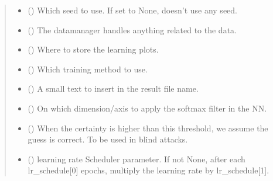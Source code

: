 \documentclass[letterpaper,10pt,english]{sphinxmanual}
\begin{document}
\begin{fulllineitems}
\begin{fulllineitems}
\begin{quote}
\begin{description}
\begin{itemize}
\item {} 
\sphinxAtStartPar
{} () \textendash{} Which seed to use. If set to None, doesn’t use any seed.

\item {} 
\sphinxAtStartPar
{} () \textendash{} The datamanager handles anything related to the data.

\item {} 
\sphinxAtStartPar
{} () \textendash{} Where to store the learning plots.

\item {} 
\sphinxAtStartPar
{} (\sphinxstyleliteralemphasis{\sphinxupquote{, }}) \textendash{} Which training method to use.

\item {} 
\sphinxAtStartPar
{} (\sphinxstyleliteralemphasis{\sphinxupquote{, }}) \textendash{} A small text to insert in the result file name.

\item {} 
\sphinxAtStartPar
{} (\sphinxstyleliteralemphasis{\sphinxupquote{, }}) \textendash{} On which dimension/axis to apply the softmax filter in the NN.

\item {} 
\sphinxAtStartPar
{} (\sphinxstyleliteralemphasis{\sphinxupquote{, }}) \textendash{} When the certainty is higher than this threshold, we assume the guess is correct.
To be used in blind attacks.

\item {} 
\sphinxAtStartPar
{} (\sphinxstyleliteralemphasis{\sphinxupquote{{[}}}\sphinxstyleliteralemphasis{\sphinxupquote{,}}\sphinxstyleliteralemphasis{\sphinxupquote{{]} }}\sphinxstyleliteralemphasis{\sphinxupquote{| }}) \textendash{} learning rate Scheduler parameter. If not None, after each lr\_schedule{[}0{]} epochs,
multiply the learning rate by lr\_schedule{[}1{]}.


\end{itemize}
\end{description}
\end{quote}
\end{fulllineitems}
\end{fulllineitems}
\end{document}
